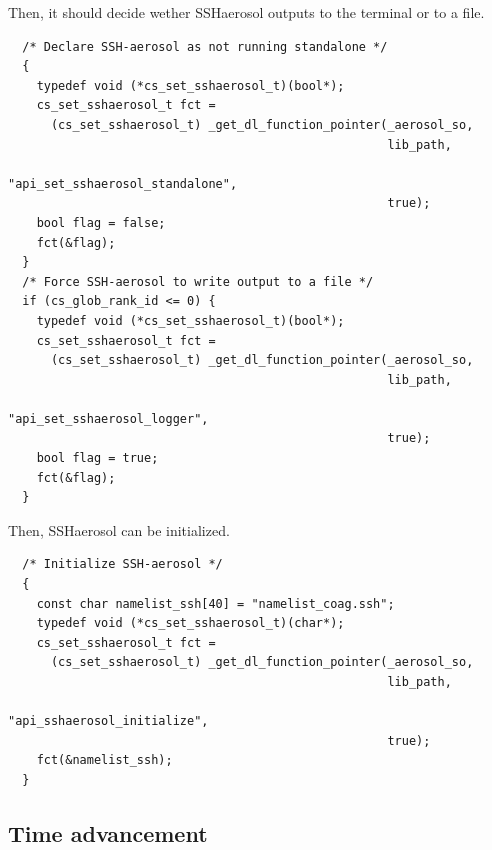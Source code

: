 \documentclass[a4paper,11pt]{article}
\begin{document}
Then, it should decide wether SSHaerosol outputs to the terminal or to a file.
\begin{verbatim}
  /* Declare SSH-aerosol as not running standalone */
  {
    typedef void (*cs_set_sshaerosol_t)(bool*);
    cs_set_sshaerosol_t fct =
      (cs_set_sshaerosol_t) _get_dl_function_pointer(_aerosol_so,
                                                     lib_path,
                                                    "api_set_sshaerosol_standalone",
                                                     true);
    bool flag = false;
    fct(&flag);
  }
  /* Force SSH-aerosol to write output to a file */
  if (cs_glob_rank_id <= 0) {
    typedef void (*cs_set_sshaerosol_t)(bool*);
    cs_set_sshaerosol_t fct =
      (cs_set_sshaerosol_t) _get_dl_function_pointer(_aerosol_so,
                                                     lib_path,
                                                    "api_set_sshaerosol_logger",
                                                     true);
    bool flag = true;
    fct(&flag);
  }
\end{verbatim}

Then, SSHaerosol can be initialized.
\begin{verbatim}
  /* Initialize SSH-aerosol */
  {
    const char namelist_ssh[40] = "namelist_coag.ssh";
    typedef void (*cs_set_sshaerosol_t)(char*);
    cs_set_sshaerosol_t fct =
      (cs_set_sshaerosol_t) _get_dl_function_pointer(_aerosol_so,
                                                     lib_path,
                                                    "api_sshaerosol_initialize",
                                                     true);
    fct(&namelist_ssh);
  }
\end{verbatim}

\subsection*{Time advancement}
\end{document}

